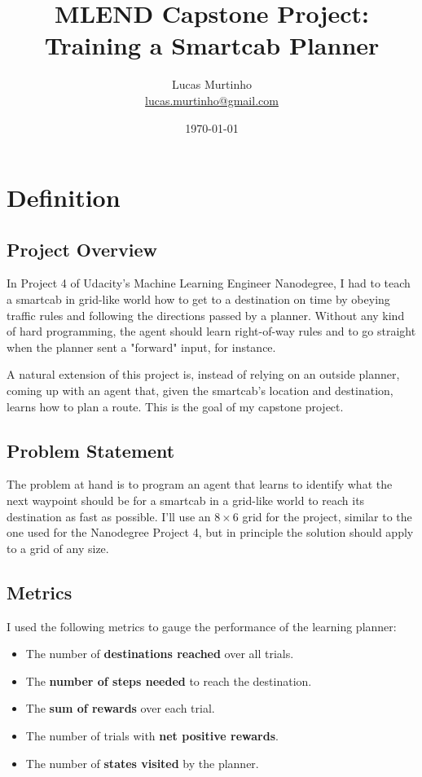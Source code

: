 \documentclass{article}
\title{MLEND Capstone Project: Training a Smartcab Planner}
\author{Lucas Murtinho \\ \url{lucas.murtinho@gmail.com}}
\date{\today}
\begin{document}
\maketitle
\tableofcontents
\newpage

\section{Definition}


\subsection{Project Overview}

In Project 4 of Udacity's Machine Learning Engineer Nanodegree, I had to teach a smartcab in grid-like world how to get to a destination on time by obeying traffic rules and following the directions passed by a planner. Without any kind of hard programming, the agent should learn right-of-way rules and to go straight when the planner sent a "forward" input, for instance.

A natural extension of this project is, instead of relying on an outside planner, coming up with an agent that, given the smartcab's location and destination, learns how to plan a route. This is the goal of my capstone project.


\subsection{Problem Statement}

The problem at hand is to program an agent that learns to identify what the next waypoint should be for a smartcab in a grid-like world to reach its destination as fast as possible. I'll use an $8\times6$ grid for the project, similar to the one used for the Nanodegree Project 4, but in principle the solution should apply to a grid of any size.


\subsection{Metrics}
\label{sec:metrics}

I used the following metrics to gauge the performance of the learning planner:

\begin{itemize}
    \item The number of \textbf{destinations reached} over all trials.
    \item The \textbf{number of steps needed} to reach the destination.
    \item The \textbf{sum of rewards}  over each trial.
    \item The number of trials with \textbf{net positive rewards}.
    \item The number of \textbf{states visited} by the planner.

\end{itemize}
\end{document}
